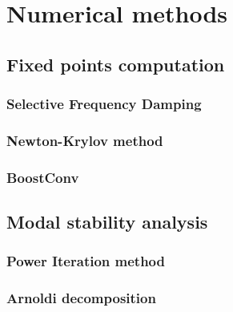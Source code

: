 \section{Numerical methods}
\label{sec: numerics}






  \subsection{Fixed points computation}

    \subsubsection{Selective Frequency Damping}

    \subsubsection{Newton-Krylov method}

    \subsubsection{BoostConv}





  \subsection{Modal stability analysis}

    \subsubsection{Power Iteration method}

    \subsubsection{Arnoldi decomposition}

